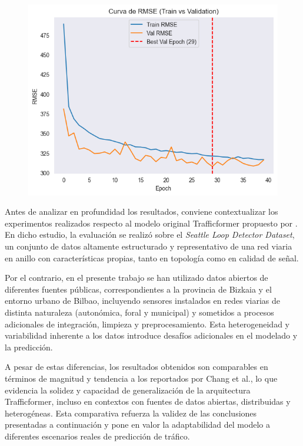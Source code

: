 \begin{figure}[H]
\begin{minipage}{0.48\textwidth}
		\vspace{0.2cm}
		\includegraphics[width=\linewidth]{includes/cap5/graphs/sid5_trafficformer_rmse.png}
	\end{minipage}
	\label{fig:curvas_sid5_trafficformer}
\end{figure}

Antes de analizar en profundidad los resultados, conviene contextualizar los experimentos realizados respecto al modelo original Trafficformer propuesto por \cite{trafficformer}. En dicho estudio, la evaluación se realizó sobre el \textit{Seattle Loop Detector Dataset}, un conjunto de datos altamente estructurado y representativo de una red viaria en anillo con características propias, tanto en topología como en calidad de señal.

Por el contrario, en el presente trabajo se han utilizado datos abiertos de diferentes fuentes públicas, correspondientes a la provincia de Bizkaia y el entorno urbano de Bilbao, incluyendo sensores instalados en redes viarias de distinta naturaleza (autonómica, foral y municipal) y sometidos a procesos adicionales de integración, limpieza y preprocesamiento. Esta heterogeneidad y variabilidad inherente a los datos introduce desafíos adicionales en el modelado y la predicción.

A pesar de estas diferencias, los resultados obtenidos son comparables en términos de magnitud y tendencia a los reportados por Chang et al., lo que evidencia la solidez y capacidad de generalización de la arquitectura Trafficformer, incluso en contextos con fuentes de datos abiertas, distribuidas y heterogéneas. Esta comparativa refuerza la validez de las conclusiones presentadas a continuación y pone en valor la adaptabilidad del modelo a diferentes escenarios reales de predicción de tráfico.

